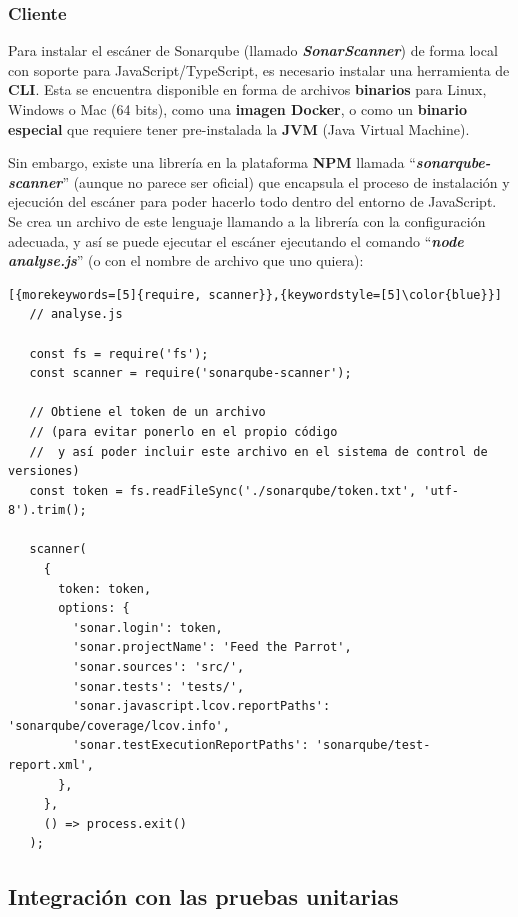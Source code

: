 \documentclass[11pt,spanish,listoffigures,listoftables,table,hyphens,dvipsnames]{tfgetsinf}
\begin{document}
\subsubsection{Cliente}%

Para instalar el escáner de Sonarqube (llamado \textbf{\emph{SonarScanner}}) de forma local con soporte para JavaScript/TypeScript, es necesario instalar una herramienta de \textbf{CLI}. Esta se encuentra disponible en forma de archivos \textbf{binarios} para Linux, Windows o Mac (64 bits), como una \textbf{imagen Docker}, o como un \textbf{binario especial} que requiere tener pre-instalada la \textbf{JVM} (Java Virtual Machine).

Sin embargo, existe una librería en la plataforma \textbf{NPM} llamada ``\textbf{\emph{sonarqube-scanner}}'' (aunque no parece ser oficial) que encapsula el proceso de instalación y ejecución del escáner para poder hacerlo todo dentro del entorno de JavaScript. Se crea un archivo de este lenguaje llamando a la librería con la configuración adecuada, y así se puede ejecutar el escáner ejecutando el comando ``\textbf{\emph{node analyse.js}}'' (o con el nombre de archivo que uno quiera):

\begin{lstlisting}[{morekeywords=[5]{require, scanner}},{keywordstyle=[5]\color{blue}}]
   // analyse.js

   const fs = require('fs');
   const scanner = require('sonarqube-scanner');
  
   // Obtiene el token de un archivo
   // (para evitar ponerlo en el propio código
   //  y así poder incluir este archivo en el sistema de control de versiones)
   const token = fs.readFileSync('./sonarqube/token.txt', 'utf-8').trim();
   
   scanner(
     {
       token: token,
       options: {
         'sonar.login': token,
         'sonar.projectName': 'Feed the Parrot',
         'sonar.sources': 'src/',
         'sonar.tests': 'tests/',
         'sonar.javascript.lcov.reportPaths': 'sonarqube/coverage/lcov.info',
         'sonar.testExecutionReportPaths': 'sonarqube/test-report.xml',
       },
     },
     () => process.exit()
   );
\end{lstlisting}

\subsection{Integración con las pruebas unitarias} %
\label{seccion:sonarqube-integracion-pruebas}
\end{document}
